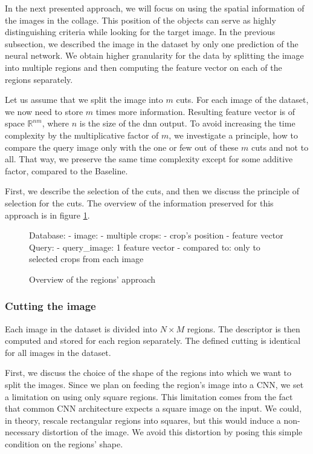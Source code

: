 In the next presented approach, we will focus on using the spatial information of the images in the collage. This position of the objects can serve as highly distinguishing criteria while looking for the target image. In the previous subsection, we described the image in the dataset by only one prediction of the neural network. We obtain higher granularity for the data by splitting the image into multiple regions and then computing the feature vector on each of the regions separately.

Let us assume that we split the image into $m$ cuts. For each image of the dataset, we now need to store $m$ times more information. Resulting feature vector is of space $\mathbb{R}^{nm}$, where $n$ is the size of the \acrshort{dnn} output. To avoid increasing the time complexity by the multiplicative factor of $m$, we investigate a principle, how to compare the query image only with the one or few out of these $m$ cuts and not to all. That way, we preserve the same time complexity except for some additive factor, compared to the Baseline.

First, we describe the selection of the cuts, and then we discuss the principle of selection for the cuts. The overview of the information preserved for this approach is in figure \ref{fig:overview_regions}.

\begin{figure}
\centering
\begin{boxedverbatim}
Database:
    - image:
        - multiple crops:
            - crop's position
            - feature vector
Query:
    - query_image: 1 feature vector
    - compared to: only to selected crops from each image
\end{boxedverbatim}
\caption{Overview of the regions' approach}
\label{fig:overview_regions}
\end{figure}

\subsubsection{Cutting the image}

Each image in the dataset is divided into $N \times M$ regions. The descriptor is then computed and stored for each region separately. The defined cutting is identical for all images in the dataset.

First, we discuss the choice of the shape of the regions into which we want to split the images. Since we plan on feeding the region's image into a CNN, we set a limitation on using only square regions. This limitation comes from the fact that common CNN architecture expects a square image on the input. We could, in theory, rescale rectangular regions into squares, but this would induce a non-necessary distortion of the image. We avoid this distortion by posing this simple condition on the regions' shape.

